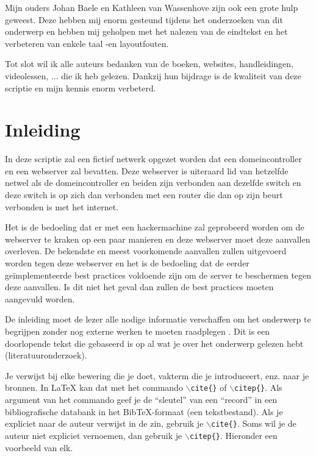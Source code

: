 \documentclass[pdftex,a4paper,12pt]{report}
\begin{document}
Mijn ouders Johan Baele en Kathleen van Wassenhove zijn ook een grote hulp geweest. Deze hebben mij enorm gesteund tijdens het onderzoeken van dit onderwerp en hebben mij geholpen met het nalezen van de eindtekst en het verbeteren van enkele taal -en layoutfouten. \newline

Tot slot wil ik alle auteurs bedanken van de boeken, websites, handleidingen, videolessen, ... die ik heb gelezen. Dankzij hun bijdrage is de kwaliteit van deze scriptie en mijn kennis enorm verbeterd. 


\tableofcontents



\chapter{Inleiding}
\label{ch:inleiding}
In deze scriptie zal een fictief netwerk opgezet worden dat een domeincontroller en een webserver zal bevatten. Deze webserver is uiteraard lid van hetzelfde netwel als de domeincontroller en beiden zijn verbonden aan dezelfde switch en deze switch is op zich dan verbonden met een router die dan op zijn beurt verbonden is met het internet. \newline

Het is de bedoeling dat er met een hackermachine zal geprobeerd worden om de webserver te kraken op een paar manieren en deze webserver moet deze aanvallen overleven. De bekendste en meest voorkomende aanvallen zullen uitgevoerd worden tegen deze webserver en het is de bedoeling dat de eerder geïmplementeerde best practices voldoende zijn om de server te beschermen tegen deze aanvallen. Is dit niet het geval dan zullen de best practices moeten aangevuld worden. \newline

De inleiding moet de lezer alle nodige informatie verschaffen om het onderwerp te begrijpen zonder nog externe werken te moeten raadplegen \citep{Pollefliet2011}. Dit is een doorlopende tekst die gebaseerd is op al wat je over het onderwerp gelezen hebt (literatuuronderzoek). \newline \newline

Je verwijst bij elke bewering die je doet, vakterm die je introduceert, enz. naar je bronnen. In \LaTeX{} kan dat met het commando \texttt{$\backslash${cite\{\}}} of \texttt{$\backslash${citep\{\}}}. Als argument van het commando geef je de ``sleutel'' van een ``record'' in een bibliografische databank in het Bib\TeX{}-formaat (een tekstbestand). Als je expliciet naar de auteur verwijst in de zin, gebruik je \texttt{$\backslash${}cite\{\}}.
Soms wil je de auteur niet expliciet vernoemen, dan gebruik je \texttt{$\backslash${}citep\{\}}. Hieronder een voorbeeld van elk.
\end{document}
